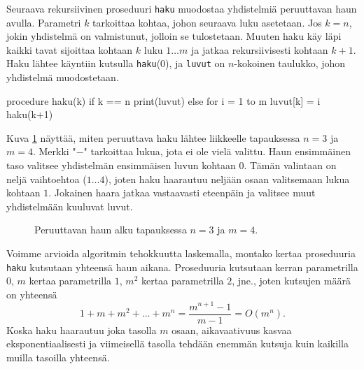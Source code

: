 Seuraava rekursiivinen proseduuri \texttt{haku} muodostaa
yhdistelmiä peruuttavan haun avulla.
Parametri $k$ tarkoittaa kohtaa, johon seuraava luku asetetaan.
Jos $k=n$, jokin yhdistelmä on valmistunut, jolloin se tulostetaan.
Muuten haku käy läpi kaikki tavat sijoittaa kohtaan $k$ luku $1 \dots m$
ja jatkaa rekursiivisesti kohtaan $k+1$.
Haku lähtee käyntiin kutsulla \texttt{haku}(0),
ja \texttt{luvut} on $n$-kokoinen taulukko, johon yhdistelmä muodostetaan.

\begin{code}
procedure haku(k)
    if k == n
        print(luvut)
    else
        for i = 1 to m
            luvut[k] = i
            haku(k+1)
\end{code}

Kuva \ref{fig:perhak} näyttää, miten peruuttava haku lähtee liikkeelle
tapauksessa $n=3$ ja $m=4$.
Merkki "$-$" tarkoittaa lukua, jota ei ole vielä valittu.
Haun ensimmäinen taso valitsee yhdistelmän
ensimmäisen luvun kohtaan $0$.
Tämän valintaan on neljä vaihtoehtoa ($1 \dots 4$),
joten haku haarautuu neljään osaan valitsemaan lukua kohtaan $1$.
Jokainen haara jatkaa vastaavasti eteenpäin
ja valitsee muut yhdistelmään kuuluvat luvut.

\begin{figure}
\center
{}
\caption{Peruuttavan haun alku tapauksessa $n=3$ ja $m=4$.}
\label{fig:perhak}
\end{figure}

Voimme arvioida algoritmin tehokkuutta laskemalla,
montako kertaa proseduuria \texttt{haku} kutsutaan yhteensä haun aikana.
Proseduuria kutsutaan kerran parametrilla $0$,
$m$ kertaa parametrilla $1$, $m^2$ kertaa parametrilla $2$, jne.,
joten kutsujen määrä on yhteensä
\[
1+m+m^2+\dots+m^n = \frac{m^{n+1}-1}{m-1} = O(m^n).
\]
Koska haku haarautuu joka tasolla $m$ osaan,
aikavaativuus kasvaa eksponentiaalisesti ja viimeisellä
tasolla tehdään enemmän kutsuja kuin kaikilla muilla tasoilla yhteensä.

